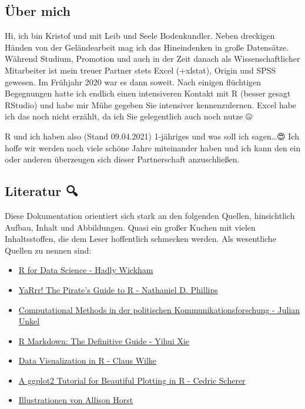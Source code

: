 \documentclass[
]{article}
\providecommand{\tightlist}{%
  \setlength{\itemsep}{0pt}\setlength{\parskip}{0pt}}
\begin{document}
\hypertarget{uxfcber-mich}{%
\subsection{Über mich}\label{uxfcber-mich}}

Hi, ich bin Kristof und mit Leib und Seele Bodenkundler. Neben dreckigen Händen von der Geländearbeit mag ich das Hineindenken in große Datensätze. Während Studium, Promotion und auch in der Zeit danach als Wissenschaftlicher Mitarbeiter ist mein treuer Partner stets Excel (+xlstat), Origin und SPSS gewesen. Im Frühjahr 2020 war es dann soweit. Nach einigen flüchtigen Begegnungen hatte ich endlich einen intensiveren Kontakt mit R (besser gesagt RStudio) und habe mir Mühe gegeben Sie intensiver kennenzulernen. Excel habe ich das noch nicht erzählt, da ich Sie gelegentlich auch noch nutze 🤐

R und ich haben also (Stand 09.04.2021) 1-jähriges und was soll ich sagen\ldots😍 Ich hoffe wir werden noch viele schöne Jahre miteinander haben und ich kann den ein oder anderen überzeugen sich dieser Partnerschaft anzuschließen.

\hypertarget{literatur}{%
\subsection{Literatur 🔍}\label{literatur}}

Diese Dokumentation orientiert sich stark an den folgenden Quellen, hinsichtlich Aufbau, Inhalt und Abbildungen. Quasi ein großer Kuchen mit vielen Inhaltsstoffen, die dem Leser hoffentlich schmecken werden. Als wesentliche Quellen zu nennen sind:

\begin{itemize}
\tightlist
\item
  \href{https://r4ds.had.co.nz/index.html}{R for Data Science - Hadly Wickham}
\item
  \href{https://bookdown.org/ndphillips/YaRrr/}{YaRrr! The Pirate's Guide to R - Nathaniel D. Phillips}
\item
  \href{https://bookdown.org/joone/ComputationalMethods/}{Computational Methods in der politischen Kommunikationsforschung - Julian Unkel}
\item
  \href{https://bookdown.org/yihui/rmarkdown/}{R Markdown: The Definitive Guide - Yihui Xie}
\item
  \href{https://wilkelab.org/SDS375/}{Data Visualization in R - Claus Wilke}
\item
  \href{https://www.cedricscherer.com/2019/08/05/a-ggplot2-tutorial-for-beautiful-plotting-in-r/\#colors}{A ggplot2 Tutorial for Beautiful Plotting in R - Cedric Scherer}
\item
  \href{https://github.com/allisonhorst/stats-illustrations}{Illustrationen von Allison Horst}
\end{itemize}
\end{document}
